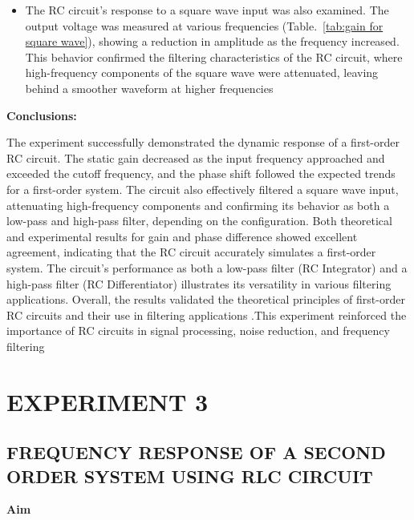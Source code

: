 \documentclass[11pt]{scrreprt}
\begin{document}
\begin{itemize}
\item The RC circuit’s response to a square wave input was also examined. The output voltage was measured at various frequencies (Table.~\ref{tab:gain for square wave}), showing a reduction in amplitude as the frequency increased. This behavior confirmed the filtering characteristics of the RC circuit, where high-frequency components of the square wave were attenuated, leaving behind a smoother waveform at higher frequencies
\end{itemize}
\noindent\textbf{Conclusions:}
\par The experiment successfully demonstrated the dynamic response of a first-order RC circuit. The static gain decreased as the input frequency approached and exceeded the cutoff frequency, and the phase shift followed the expected trends for a first-order system. The circuit also effectively filtered a square wave input, attenuating high-frequency components and confirming its behavior as both a low-pass and high-pass filter, depending on the configuration.    Both theoretical and experimental results for gain and phase difference showed excellent agreement, indicating that the RC circuit accurately simulates a first-order system. The circuit’s performance as both a low-pass filter (RC Integrator) and a high-pass filter (RC Differentiator) illustrates its versatility in various filtering applications. Overall, the results validated the theoretical principles of first-order RC circuits and their use in filtering applications .This experiment reinforced the importance of RC circuits in signal processing, noise reduction, and frequency filtering


\chapter*{\Large EXPERIMENT 3}
\setcounter{chapter}{3}
\setcounter{table}{0}
\setcounter{figure}{0}
\section*{\normalsize FREQUENCY RESPONSE OF A SECOND ORDER SYSTEM USING RLC CIRCUIT}
\textbf{Aim}
\end{document}
